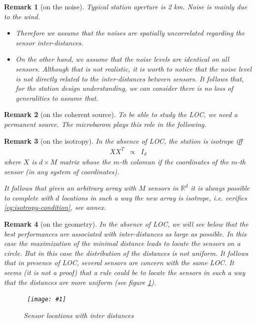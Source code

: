 \documentclass[a4paper, 12pt]{report}
\newcommand{\figscale}[4]{
\begin{figure}[hbtp]
\centerline{
    \hbox{ \texttt{[image: \#1]} }
}
\begin{center}
\parbox{14 cm}
{
    \caption{\protect\small\it  {#2}}
    \label {#3}
}
\end{center}

\end{figure}}
\newtheorem{remark}{Remark}
\begin{document}
\begin{remark}[on the noise]
Typical station aperture  is 2 km. Noise is mainly due to the wind.
\begin{itemize}
\item
Therefore we assume that the noises are spatially uncorrelated regarding the sensor inter-distances.
\item
On the other hand, we assume that the noise levels are identical on all sensors. Although that is not realistic, it is worth to notice that the noise level is not directly related to the inter-distances between sensors. It follows that, for the station design understanding, we can consider there is no loss of generalities to assume that.
\end{itemize}
\end{remark}

\begin{remark}[on the coherent source]
To be able to study the LOC, we need a permanent source. The microbarom plays this role in the following.
\end{remark}

\begin{remark}[on the isotropy]
In the absence of LOC, the station is isotrope iff 
\begin{eqnarray}
 \label{eq:isotropy-condition}
XX^{T}&\propto&I_{d}
\end{eqnarray}
where $X$ is $d\times M$ matrix whose the $m$-th colomun if the coordinates of the $m$-th sensor (in any  system of coordinates). 

It follows that  given an arbitrary array with $M$ sensors in $\mathds{R}^{d}$ it is always possible to complete with $d$ locations in such a way the new array is isotrope, i.e. verifies \eqref{eq:isotropy-condition}, see annex.

\end{remark}

\begin{remark}[on the geometry]
In the absence of LOC, we will see below that the best performances are associated with inter-distances as large as possible. In this case the maximization of the minimal distance leads to locate the sensors on a circle. But in this case the distribution of the distances is not uniform. It follows that in presence of LOC, several sensors are concern with the same LOC. It seems (it is not a proof) that a rule could be to locate the sensors in such a way that the distances are more uniform (see figure \ref{fig:uniforinterdistances}).

\figscale{../figures/uniforinterdistances.pdf}{Sensor locations with inter distances}{fig:uniforinterdistances}{0.9}

\end{remark}
\end{document}
